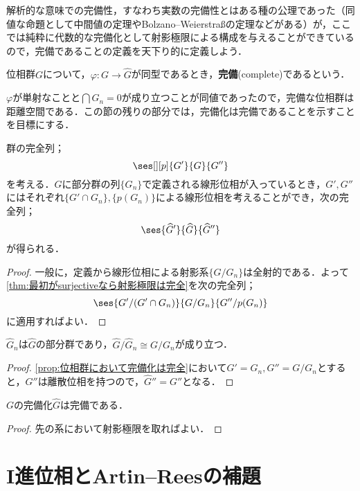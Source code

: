 解析的な意味での完備性，すなわち実数の完備性とはある種の公理であった（同値な命題として中間値の定理やBolzano--Weierstra\ss の定理などがある）が，ここでは純粋に代数的な完備化として射影極限による構成を与えることができているので，完備であることの定義を天下り的に定義しよう．

\begin{defi}[完備]
	位相群$G$について，$\varphi:G\to\widehat{G}$が同型であるとき，\textbf{完備}(complete)であるという．
\end{defi}

$\varphi$が単射なことと$\bigcap G_n=0$が成り立つことが同値であったので，完備な位相群は距離空間である．この節の残りの部分では，完備化は完備であることを示すことを目標にする．

\begin{prop}\label{prop:位相群において完備化は完全}
	群の完全列；
	\[\ses[][p]{G'}{G}{G''}\]
	を考える．$G$に部分群の列$\{G_n\}$で定義される線形位相が入っているとき，$G',G''$にはそれぞれ$\{G'\cap G_n\},\{p(G_n)\}$による線形位相を考えることができ，次の完全列；
	\[\ses{\widehat{G}'}{\widehat{G}}{\widehat{G}''}\]
	が得られる．
\end{prop}

\begin{proof}
	一般に，定義から線形位相による射影系$\{G/G_n\}$は全射的である．よって\ref{thm:最初がsurjectiveなら射影極限は完全}を次の完全列；
	\[\ses{G'/(G'\cap G_n)}{G/G_n}{G''/p(G_n)}\]
	に適用すればよい．
\end{proof}

\begin{cor}\label{cor:完備化しても商は同型}
	$\widehat{G}_n$は$\widehat{G}$の部分群であり，$\widehat{G}/\widehat{G}_n\cong G/G_n$が成り立つ．
\end{cor}

\begin{proof}
	\ref{prop:位相群において完備化は完全}において$G'=G_n,G''=G/G_n$とすると，$G''$は離散位相を持つので，$\widehat{G}''=G''$となる．
\end{proof}

\begin{cor}
	$G$の完備化$\widehat{G}$は完備である．
\end{cor}

\begin{proof}
	先の系において射影極限を取ればよい．
\end{proof}

\section{I進位相とArtin--Reesの補題}

